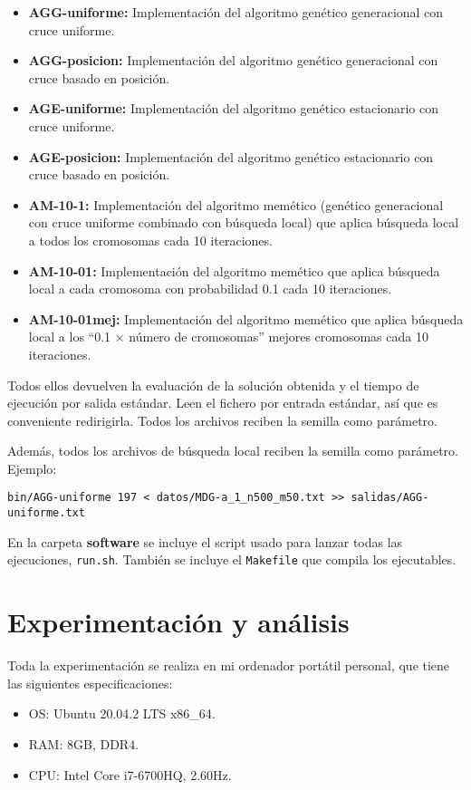 \documentclass{article}
\begin{document}
\begin{itemize}
	\item \textbf{AGG-uniforme:} Implementación del algoritmo genético generacional con cruce uniforme.
	\item \textbf{AGG-posicion:} Implementación del algoritmo genético generacional con cruce basado en posición.
	\item \textbf{AGE-uniforme:} Implementación del algoritmo genético estacionario con cruce uniforme. 
	\item \textbf{AGE-posicion:} Implementación del algoritmo genético estacionario con cruce basado en posición.
	\item \textbf{AM-10-1:} Implementación del algoritmo memético (genético generacional con cruce uniforme combinado con búsqueda local) que aplica búsqueda local a todos los cromosomas cada 10 iteraciones.
	\item \textbf{AM-10-01:} Implementación del algoritmo memético que aplica búsqueda local a cada cromosoma con probabilidad 0.1 cada 10 iteraciones.
	\item \textbf{AM-10-01mej:} Implementación del algoritmo memético que aplica búsqueda local a los ``0.1 $\times$ número de cromosomas'' mejores cromosomas cada 10 iteraciones.
\end{itemize}

Todos ellos devuelven la evaluación de la solución obtenida y el tiempo de ejecución por salida estándar.
Leen el fichero por entrada estándar, así que es conveniente redirigirla.
Todos los archivos reciben la semilla como parámetro.

Además, todos los archivos de búsqueda local reciben la semilla como parámetro. Ejemplo:
\begin{verbatim}
bin/AGG-uniforme 197 < datos/MDG-a_1_n500_m50.txt >> salidas/AGG-uniforme.txt
\end{verbatim}

En la carpeta \textbf{software} se incluye el script usado para lanzar todas las ejecuciones, \texttt{run.sh}. También se incluye
el \texttt{Makefile} que compila los ejecutables.

\pagebreak

\section{Experimentación y análisis}

Toda la experimentación se realiza en mi ordenador portátil personal, que tiene las siguientes especificaciones:
\begin{itemize}
	\item OS: Ubuntu 20.04.2 LTS x86\_64.
	\item RAM: 8GB, DDR4.
	\item CPU: Intel Core i7-6700HQ, 2.60Hz.
\end{itemize}
\end{document}
